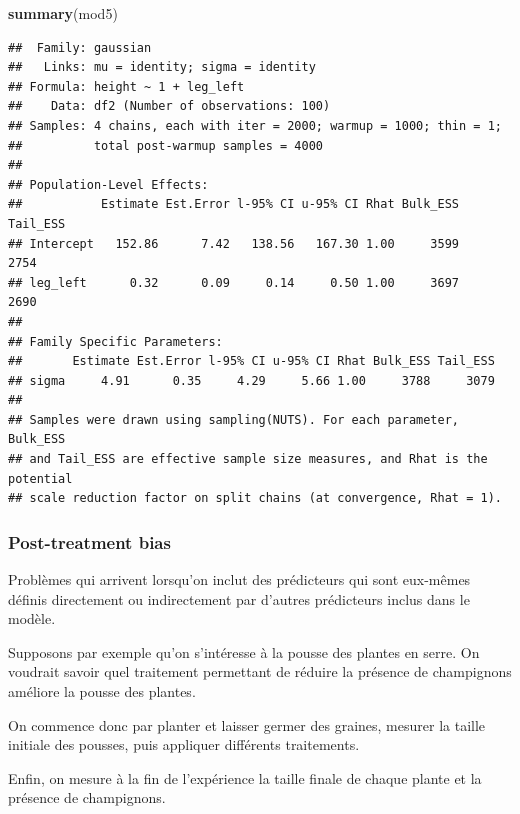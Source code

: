 \documentclass[
  a4paper,11pt,twoside,onecolumn,openright,final,oldfontcommands]{memoir}
\newenvironment{Shaded}{\begin{snugshade}}{\end{snugshade}}
\newcommand{\KeywordTok}[1]{\textcolor[rgb]{0.13,0.29,0.53}{\textbf{#1}}}
\newcommand{\NormalTok}[1]{#1}
\theoremstyle{definition}
\theoremstyle{definition}
\theoremstyle{definition}
\theoremstyle{remark}
\begin{document}
\begin{Shaded}
\begin{Highlighting}[]
\KeywordTok{summary}\NormalTok{(mod5)}
\end{Highlighting}
\end{Shaded}

\begin{verbatim}
##  Family: gaussian 
##   Links: mu = identity; sigma = identity 
## Formula: height ~ 1 + leg_left 
##    Data: df2 (Number of observations: 100) 
## Samples: 4 chains, each with iter = 2000; warmup = 1000; thin = 1;
##          total post-warmup samples = 4000
## 
## Population-Level Effects: 
##           Estimate Est.Error l-95% CI u-95% CI Rhat Bulk_ESS Tail_ESS
## Intercept   152.86      7.42   138.56   167.30 1.00     3599     2754
## leg_left      0.32      0.09     0.14     0.50 1.00     3697     2690
## 
## Family Specific Parameters: 
##       Estimate Est.Error l-95% CI u-95% CI Rhat Bulk_ESS Tail_ESS
## sigma     4.91      0.35     4.29     5.66 1.00     3788     3079
## 
## Samples were drawn using sampling(NUTS). For each parameter, Bulk_ESS
## and Tail_ESS are effective sample size measures, and Rhat is the potential
## scale reduction factor on split chains (at convergence, Rhat = 1).
\end{verbatim}

\hypertarget{post-treatment-bias}{%
\subsubsection{Post-treatment bias}\label{post-treatment-bias}}

Problèmes qui arrivent lorsqu'on inclut des prédicteurs qui sont eux-mêmes définis directement ou indirectement par d'autres prédicteurs inclus dans le modèle.

Supposons par exemple qu'on s'intéresse à la pousse des plantes en serre. On voudrait savoir quel traitement permettant de réduire la présence de champignons améliore la pousse des plantes.

On commence donc par planter et laisser germer des graines, mesurer la taille initiale des pousses, puis appliquer différents traitements.

Enfin, on mesure à la fin de l'expérience la taille finale de chaque plante et la présence de champignons.
\end{document}
